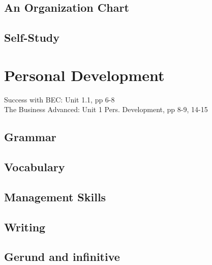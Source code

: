 \subsection{An Organization Chart}
\subsection{Self-Study}


\section{Personal Development}
Success with BEC: Unit 1.1, pp 6-8\\
The Business Advanced: Unit 1 Pers. Development, pp 8-9, 14-15
\subsection{Grammar}

\subsection{Vocabulary}
\subsection{Management Skills}

\subsection{Writing}

\subsection{Gerund and infinitive}
